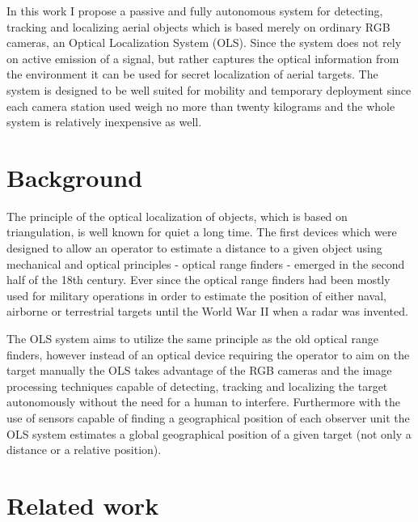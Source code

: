 In this work I propose a passive and fully autonomous system for detecting, tracking and localizing aerial objects which is based merely on ordinary RGB cameras, an Optical Localization System (OLS). Since the system does not rely on active emission of a signal, but rather captures the optical information from the environment it can be used for secret localization of aerial targets. The system is designed to be well suited for mobility and temporary deployment since each camera station used weigh no more than twenty kilograms and the whole system is relatively inexpensive as well.


\section{Background} \label{txt:background}

The principle of the optical localization of objects, which is based on triangulation, is well known for quiet a long time. The first devices which were designed to allow an operator to estimate a distance to a given object using mechanical and optical principles - optical range finders - emerged in the second half of the 18th century\cite{bud1998instruments}. Ever since the optical range finders had been mostly used for military operations in order to estimate the position of either naval, airborne or terrestrial targets until the World War II when a radar was invented.

The OLS system aims to utilize the same principle as the old optical range finders, however instead of an optical device requiring the operator to aim on the target manually the OLS takes advantage of the RGB cameras and the image processing techniques capable of detecting, tracking and localizing the target autonomously without the need for a human to interfere. Furthermore with the use of sensors capable of finding a geographical position of each observer unit the OLS system estimates a global geographical position of a given target (not only a distance or a relative position).


\section{Related work}

